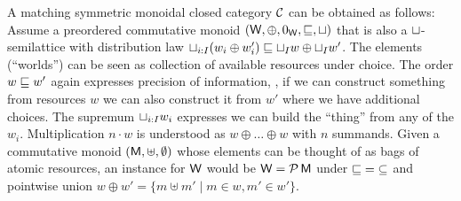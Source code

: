 \documentclass[acmsmall,review,anonymous]{acmart}\settopmatter{printfolios=true,printccs=false,printacmref=false}
\begin{document}
A matching symmetric monoidal closed category $\mathcal{C}$ can be obtained as
follows:
%
Assume a preordered commutative monoid $(\mathsf{W},\oplus,0_{\mathsf{W}},\sqsubseteq,\sqcup)$
that is also a $\sqcup$-semilattice with distribution law $\sqcup_{i:I} (w_i \oplus w'_i) \sqsubseteq \sqcup_I w \oplus \sqcup_I w'$.  The elements (``worlds'') can be
seen as collection of available resources under choice.  The
order $w \sqsubseteq w'$ again expresses precision of information, \ie, if
we can construct something from resources $w$ we can also construct it
from $w'$ where we have additional choices.
The supremum $\sqcup_{i:I}w_i$ expresses we can build the
``thing'' from any of the $w_i$.  Multiplication $n \cdot w$ is
understood as $w \oplus \dots \oplus w$ with $n$ summands.
%
Given a commutative monoid $(\mathsf{M},\uplus,\emptyset)$ whose elements can
be thought of as bags of atomic resources, an instance for $\mathsf{W}$ would
be $\mathsf{W} = \mathcal{P}\,\mathsf{M}$ under ${\sqsubseteq} = {\subseteq}$ and pointwise union
$w \oplus w' = \{ m \uplus m' \mid m \in w, m' \in w' \}$.
\end{document}
